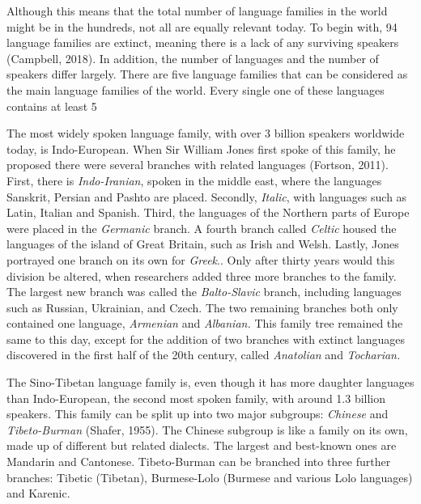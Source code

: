 Although this means that the total number of language families in the world might be in the hundreds, not all are equally relevant today. To begin with, 94 language families are extinct, meaning there is a lack of any surviving speakers (Campbell, 2018). In addition, the number of languages and the number of speakers differ largely. There are five language families that can be considered as the main language families of the world. Every single one of these languages contains at least 5%

The most widely spoken language family, with over 3 billion speakers worldwide today, is Indo-European. When Sir William Jones first spoke of this family, he proposed there were several branches with related languages (Fortson, 2011). First, there is \textit{Indo-Iranian}, spoken in the middle east, where the languages Sanskrit, Persian and Pashto are placed. Secondly, \textit{Italic}, with languages such as Latin, Italian and Spanish. Third, the languages of the Northern parts of Europe were placed in the \textit{Germanic} branch. A fourth branch called \textit{Celtic} housed the languages of the island of Great Britain, such as Irish and Welsh. Lastly, Jones portrayed one branch on its own for \textit{Greek}.. Only after thirty years would this division be altered, when researchers added three more branches to the family. The largest new branch was called the \textit{Balto-Slavic} branch, including languages such as Russian, Ukrainian, and Czech. The two remaining branches both only contained one language, \textit{Armenian} and \textit{Albanian.} This family tree remained the same to this day, except for the addition of two branches with extinct languages discovered in the first half of the 20th century, called \textit{Anatolian} and \textit{Tocharian.}  

The Sino-Tibetan language family is, even though it has more daughter languages than Indo-European, the second most spoken family, with around 1.3 billion speakers. This family can be split up into two major subgroups: \textit{Chinese} and \textit{Tibeto-Burman}  (Shafer, 1955). The Chinese subgroup is like a family on its own, made up of different but related dialects. The largest and best-known ones are Mandarin and Cantonese. Tibeto-Burman can be branched into three further branches: Tibetic (Tibetan), Burmese-Lolo (Burmese and various Lolo languages) and Karenic.  

